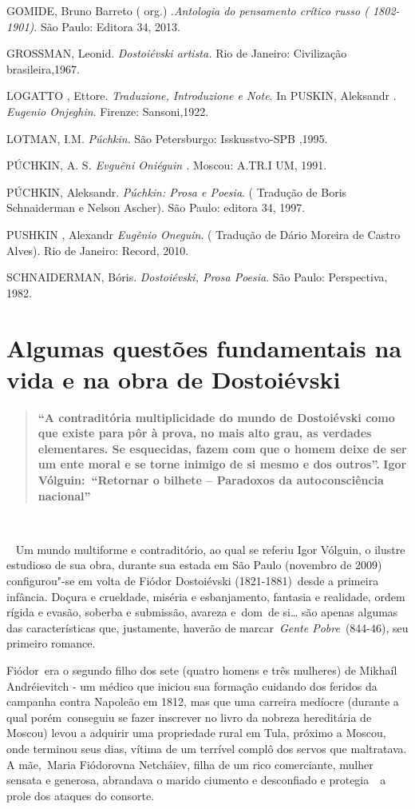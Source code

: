 GOMIDE, Bruno Barreto ( org.) .\emph{Antologia do pensamento crítico
russo ( 1802-1901)}. São Paulo: Editora 34, 2013.

GROSSMAN, Leonid. \emph{Dostoiévski artista.} Rio de Janeiro:
Civilização brasileira,1967.

LOGATTO , Ettore. \emph{Traduzione, Introduzione e Note}. In PUSKIN,
Aleksandr . \emph{Eugenio Onjeghin}. Firenze: Sansoni,1922.

LOTMAN, I.M. \emph{Púchkin}. São Petersburgo: Isskusstvo-SPB ,1995.

PÚCHKIN, A. S\emph{. Evguêni Oniéguin .} Moscou: A.TR.I UM, 1991.

PÚCHKIN, Aleksandr. \emph{Púchkin: Prosa e Poesia}. ( Tradução de Boris
Schnaiderman e Nelson Ascher). São Paulo: editora 34, 1997.

PUSHKIN , Alexandr \emph{Eugênio Oneguin}. ( Tradução de Dário Moreira
de Castro Alves). Rio de Janeiro: Record, 2010.

SCHNAIDERMAN, Bóris. \emph{Dostoiévski, Prosa Poesia}. São Paulo:
Perspectiva, 1982.

\chapter{Algumas questões fundamentais na vida e na obra de Dostoiévski}

\begin{quote}
\textbf{``A contraditória multiplicidade do mundo de Dostoiévski como
que existe para pôr à prova, no mais alto grau, as verdades elementares.
Se esquecidas, fazem com que o homem deixe de ser um ente moral e se
torne inimigo de si mesmo e dos outros''.} \textbf{Igor
Vólguin:~``Retornar o bilhete -- Paradoxos da autoconsciência
nacional''~}
\end{quote}

\textbf{~}

~ Um mundo multiforme e contraditório, ao qual se referiu Igor Vólguin,
o ilustre estudioso de sua obra, durante sua estada em São Paulo
(novembro de 2009) configurou"-se em volta de Fiódor Dostoiévski
(1821-1881)~desde a primeira infância. Doçura e crueldade, miséria e
esbanjamento, fantasia e realidade, ordem rígida e evasão, soberba e
submissão, avareza e~dom~de si\ldots{} são apenas algumas das características
que, justamente, haverão de marcar~\emph{Gente Pobre}~(844-46), seu
primeiro romance.

Fiódor~era o segundo filho dos sete (quatro homens e três mulheres) de
Mikhaíl Andréievitch - um médico que iniciou sua formação cuidando dos
feridos da campanha contra Napoleão em 1812, mas que uma carreira
medíocre (durante a qual porém~conseguiu se fazer inscrever no livro da
nobreza hereditária de Moscou) levou a adquirir uma propriedade rural em
Tula, próximo a Moscou, onde terminou seus dias, vítima de um terrível
complô dos servos que maltratava. A mãe,~Maria Fiódorovna Netcháiev,
filha de um rico comerciante, mulher sensata e generosa, abrandava o
marido ciumento e desconfiado e protegia~~a prole dos ataques do
consorte.

